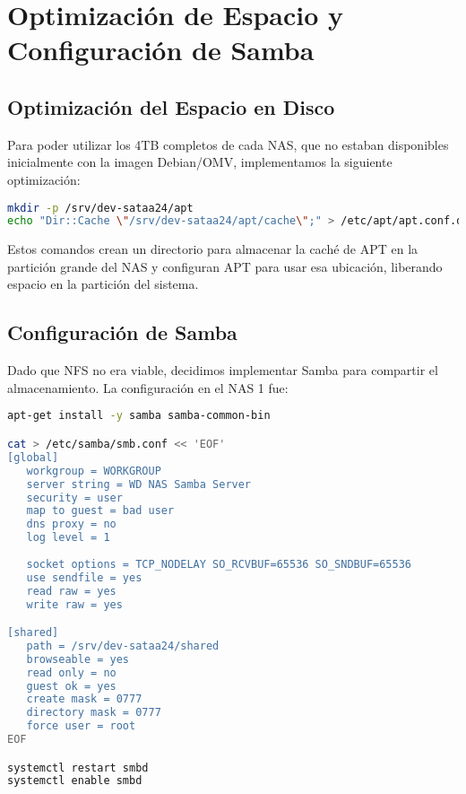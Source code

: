 \documentclass[12pt, a4paper]{article}
\begin{document}
\section{Optimización de Espacio y Configuración de Samba}

\subsection{Optimización del Espacio en Disco}
Para poder utilizar los 4TB completos de cada NAS, que no estaban disponibles inicialmente con la imagen Debian/OMV, implementamos la siguiente optimización: \\

\begin{lstlisting}[language=bash, caption=Optimización del espacio APT.]
mkdir -p /srv/dev-sataa24/apt
echo "Dir::Cache \"/srv/dev-sataa24/apt/cache\";" > /etc/apt/apt.conf.d/70bigdisk
\end{lstlisting}

Estos comandos crean un directorio para almacenar la caché de APT en la partición grande del NAS y configuran APT para usar esa ubicación, liberando espacio en la partición del sistema.

\subsection{Configuración de Samba}
Dado que NFS no era viable, decidimos implementar Samba para compartir el almacenamiento. La configuración en el NAS 1 fue: \\

\begin{lstlisting}[language=bash, caption=Configuración Samba en NAS 1.]
apt-get install -y samba samba-common-bin

cat > /etc/samba/smb.conf << 'EOF'
[global]
   workgroup = WORKGROUP
   server string = WD NAS Samba Server
   security = user
   map to guest = bad user
   dns proxy = no
   log level = 1
   
   socket options = TCP_NODELAY SO_RCVBUF=65536 SO_SNDBUF=65536
   use sendfile = yes
   read raw = yes
   write raw = yes

[shared]
   path = /srv/dev-sataa24/shared
   browseable = yes
   read only = no
   guest ok = yes
   create mask = 0777
   directory mask = 0777
   force user = root
EOF

systemctl restart smbd
systemctl enable smbd
\end{lstlisting}
\end{document}
